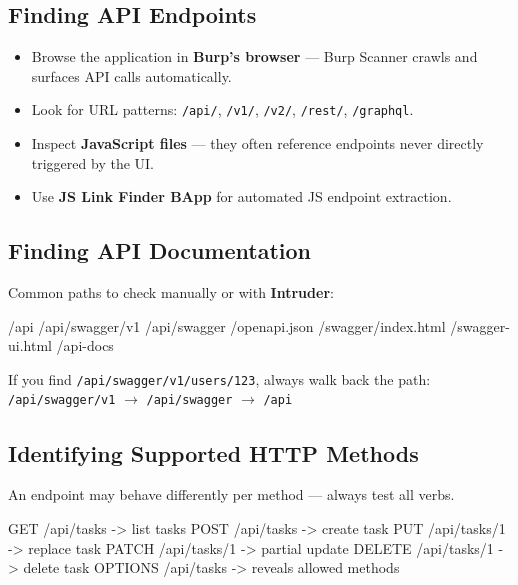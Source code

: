 \documentclass[11pt]{article}
\begin{document}
\subsection{Finding API Endpoints}

\begin{itemize}
  \item Browse the application in \textbf{Burp's browser} --- Burp Scanner crawls and surfaces API calls automatically.
  \item Look for URL patterns: \texttt{/api/}, \texttt{/v1/}, \texttt{/v2/}, \texttt{/rest/}, \texttt{/graphql}.
  \item Inspect \textbf{JavaScript files} --- they often reference endpoints never directly triggered by the UI.
  \item Use \textbf{JS Link Finder BApp} for automated JS endpoint extraction.
\end{itemize}

\subsection{Finding API Documentation}

Common paths to check manually or with \textbf{Intruder}:

\begin{httpbox}
/api
/api/swagger/v1
/api/swagger
/openapi.json
/swagger/index.html
/swagger-ui.html
/api-docs
\end{httpbox}

\begin{notebox}[Tip]
If you find \texttt{/api/swagger/v1/users/123}, always walk back the path:
\texttt{/api/swagger/v1} $\to$ \texttt{/api/swagger} $\to$ \texttt{/api}
\end{notebox}

\subsection{Identifying Supported HTTP Methods}

An endpoint may behave differently per method --- always test all verbs.

\begin{httpbox}
GET    /api/tasks        -> list tasks
POST   /api/tasks        -> create task
PUT    /api/tasks/1      -> replace task
PATCH  /api/tasks/1      -> partial update
DELETE /api/tasks/1      -> delete task
OPTIONS /api/tasks       -> reveals allowed methods
\end{httpbox}
\end{document}
